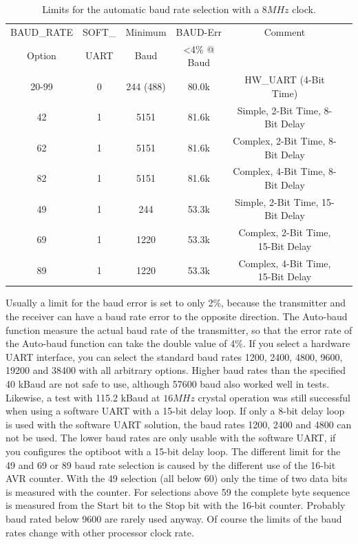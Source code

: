 \begin{table}[H]
  \begin{center}
    \begin{tabular}{| c | c | c | c | c | c |}
    \hline
   BAUD\_RATE  & SOFT\_ & Minimum & BAUD-Err & Comment  \\
   Option      & UART   & Baud    & \textless 4\% @ Baud &  \\
    \hline
    \hline
	    20-99      &  0     &  244 (488)  &   80.0k  & HW\_UART (4-Bit Time) \\
    \hline
    42         &  1     &  5151       &   81.6k  & Simple, 2-Bit Time, 8-Bit Delay  \\
    \hline
    62         &  1     &  5151       &   81.6k  & Complex, 2-Bit Time, 8-Bit Delay  \\
    \hline
    82         &  1     &  5151       &   81.6k  & Complex, 4-Bit Time, 8-Bit Delay  \\
    \hline
    49         &  1     &  244       &   53.3k  &  Simple, 2-Bit Time, 15-Bit Delay\\
    \hline
    69         &  1     &  1220       &   53.3k &  Complex, 2-Bit Time, 15-Bit Delay \\
    \hline
    89         &  1     &  1220       &   53.3k & Complex, 4-Bit Time, 15-Bit Delay \\
    \hline
    \end{tabular}
  \end{center}
  \caption{Limits for the automatic baud rate selection with a \(8MHz\) clock.}
  \label{tab:AutoBaud8}
\end{table}

Usually a limit for the baud error is set to only 2\%, because the transmitter and
the receiver can have a baud rate error to the opposite direction.
The Auto-baud function measure the actual baud rate of the transmitter,
so that the error rate of the Auto-baud function can take the double value of 4\%.
If you select a hardware UART interface, you can select the standard
baud rates 1200, 2400, 4800, 9600, 19200 and 38400 with all arbitrary options.
Higher baud rates than the specified 40 kBaud are not safe to use,
although 57600 baud also worked well in tests.
Likewise, a test with 115.2 kBaud at \(16MHz\) crystal operation was still successful
when using a software UART with a 15-bit delay loop.
If only a 8-bit delay loop is used with the software UART solution,
the baud rates 1200, 2400 and 4800 can not be used.
The lower baud rates are only usable with the software UART, if you configures
the optiboot with a 15-bit delay loop.
The different limit for the 49 and 69 or 89 baud rate selection is caused
by the different use of the 16-bit AVR counter.
With the 49 selection (all below 60) only the time of two data bits is measured
with the counter. For selections above 59 the complete byte sequence is
measured from the Start bit to the Stop bit with the 16-bit counter.
Probably baud rated below 9600 are rarely used anyway.
Of course the limits of the baud rates change with other processor clock rate.

